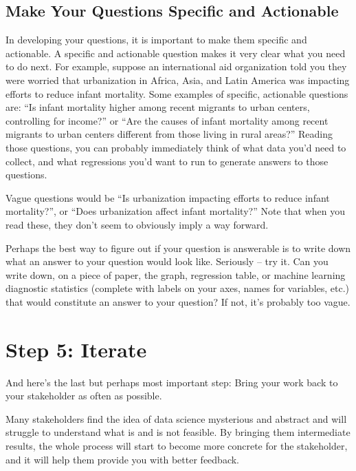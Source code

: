 \documentclass[letterpaper,10pt,english]{jupyterBook}
\begin{document}
\subsection{Make Your Questions Specific and Actionable}
\label{\detokenize{20_problems_to_questions/20_stakeholder_management:make-your-questions-specific-and-actionable}}
\sphinxAtStartPar
In developing your questions, it is important to make them specific and actionable. A specific and actionable question makes it very clear what you need to do next. For example, suppose an international aid organization told you they were worried that urbanization in Africa, Asia, and Latin America was impacting efforts to reduce infant mortality. Some examples of specific, actionable questions are: “Is infant mortality higher among recent migrants to urban centers, controlling for income?” or “Are the causes of infant mortality among recent migrants to urban centers different from those living in rural areas?” Reading those questions, you can probably immediately think of what data you’d need to collect, and what regressions you’d want to run to generate answers to those questions.

\sphinxAtStartPar
Vague questions would be “Is urbanization impacting efforts to reduce infant mortality?”, or “Does urbanization affect infant mortality?” Note that when you read these, they don’t seem to obviously imply a way forward.

\sphinxAtStartPar
Perhaps the best way to figure out if your question is answerable is to write down what an answer to your question would look like. Seriously – try it. Can you write down, on a piece of paper, the graph, regression table, or machine learning diagnostic statistics (complete with labels on your axes, names for variables, etc.) that would constitute an answer to your question? If not, it’s probably too vague.


\section{Step 5: Iterate}
\label{\detokenize{20_problems_to_questions/20_stakeholder_management:step-5-iterate}}
\sphinxAtStartPar
And here’s the last but perhaps most important step:  Bring your work back to your stakeholder as often as possible.

\sphinxAtStartPar
Many stakeholders find the idea of data science mysterious and abstract and will struggle to understand what is and is not feasible. By bringing them intermediate results, the whole process will start to become more concrete for the stakeholder, and it will help them provide you with better feedback.
\end{document}
